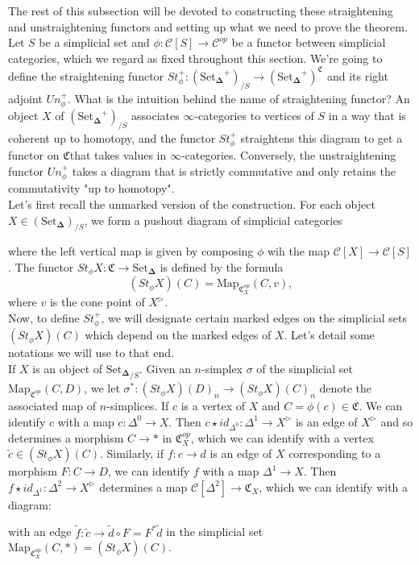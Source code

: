 \documentclass[12pt]{amsart}
\newcommand{\8}{\ensuremath{\infty}}
\newcommand{\C}{\ensuremath{\mathfrak{C}}}
\newcommand{\SSet}{\ensuremath{\text{Set}_{\boldsymbol{\Delta}}}}
\newcommand{\Map}{\ensuremath{\text{Map}}}
\begin{document}
The rest of this subsection will be devoted to constructing these straightening and unstraightening functors and setting up what we need to prove the theorem.\\
Let $S$ be a simplicial set and $\phi:\mathscr{C}[S]\rightarrow \mathcal{C}^{op}$ be a functor between simplicial categories, which we regard as fixed throughout this section. We're going to define the straightening functor $St_\phi^+:(\SSet^+)_{/S}\rightarrow (\SSet^+)^\C$ and its right adjoint $Un_\phi^+$. What is the intuition behind the name of straightening functor? An object $X$ of $(\SSet^+)_{/S}$ associates \8-categories to vertices of $S$ in a way that is coherent up to homotopy, and the functor $St_\phi^+$ straightens this diagram to get a functor on \C that takes values in \8-categories. Conversely, the unstraightening functor $Un_\phi^+$ takes a diagram that is strictly commutative and only retains the commutativity "up to homotopy".\\
Let's first recall the unmarked version of the construction. For each object $X\in(\SSet)_{/S}$, we form a pushout diagram of simplicial categories
where the left vertical map is given by composing $\phi$ wih the map $\mathscr{C}[X]\rightarrow \mathscr{C}[S]$. The functor $St_\phi X: \C\rightarrow \SSet$ is defined by the formula
\[(St_\phi X)(C) = \Map_{\C^{op}_X}(C,v),\] where $v$ is the cone point of $X^\triangleright$.\\
Now, to define $St_\phi^+$, we will designate certain marked edges on the simplicial sets $(St_\phi X)(C)$ which depend on the marked edges of $X$. Let's detail some notations we will use to that end. \\
If $X$ is an object of ${\SSet}_{/S}$. Given an $n$-simplex $\sigma$ of the simplicial set $\Map_{\C^{op}}(C,D)$, we let $\sigma^*:(St_\phi X)(D)_n \rightarrow (St_\phi X)(C)_n$ denote the associated map of $n$-simplices. If $c$ is a vertex of $X$ and $C = \phi(c)\in\C$. We can identify $c$ with a map $c:\Delta^0\rightarrow X$. Then $c\star id_{\Delta^0}:\Delta^1\rightarrow X^\triangleright$ is an edge of $X^\triangleright$ and so determines a morphism $C\rightarrow *$ in $\C^{op}_X$, which we can identify with a vertex $\tilde{c}\in(St_\phi X)(C)$. Similarly, if $f:c\rightarrow d$ is an edge of $X$ corresponding to a morphism $F:C\rightarrow D$, we can identify $f$ with a map $\Delta^1\rightarrow X$. Then $f\star id_{\Delta^1}:\Delta^2 \rightarrow X^\triangleright$ determines a map $\mathscr{C}[\Delta^2]\rightarrow \C_X$, which we can identify with a diagram:
with an edge $\tilde{f}:\tilde{c}\rightarrow \tilde{d}\circ F = F^*\tilde{d}$ in the simplicial set $\Map_{\C^{op}_X}(C,*) = (St_\phi X)(C).$
\end{document}
